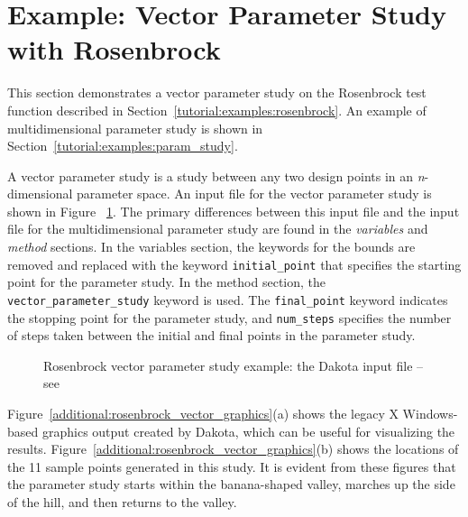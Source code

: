 \section{Example: Vector Parameter Study with Rosenbrock}\label{ps:example:vector}

This section demonstrates a vector parameter study on the Rosenbrock 
test function described in Section~\ref{tutorial:examples:rosenbrock}.  
An example of multidimensional parameter study is shown in 
Section~\ref{tutorial:examples:param_study}.

A vector parameter study is a study between any 
two design points in an \emph{n}-dimensional parameter space.
An input file for the vector parameter study is shown in Figure~
\ref{additional:rosenbrock_vector}. The primary differences
between this input file and the input file for the multidimensional
parameter study are found in the
\emph{variables} and \emph{method} sections. In the variables section,
the keywords for the bounds are removed and replaced with the keyword
\texttt{initial\_point} that specifies the starting point for the
parameter study. In the method section, the
\texttt{vector\_parameter\_study} keyword is used. The
\texttt{final\_point} keyword indicates the stopping point for the
parameter study, and \texttt{num\_steps} specifies the number of steps
taken between the initial and final points in the parameter study.

\begin{figure}[ht!]
  \centering
  \begin{bigbox}
    \begin{small}
    \end{small}
  \end{bigbox}
  \caption{Rosenbrock vector parameter study example: the Dakota input
    file -- see
    \protect{}
  }
  \label{additional:rosenbrock_vector}
\end{figure}

Figure~\ref{additional:rosenbrock_vector_graphics}(a) shows the legacy
X Windows-based graphics output created by Dakota, which can be useful
for visualizing the
results. Figure~\ref{additional:rosenbrock_vector_graphics}(b) shows
the locations of the 11 sample points generated in this study.  It is
evident from these figures that the parameter study starts within the
banana-shaped valley, marches up the side of the hill, and then
returns to the valley.

